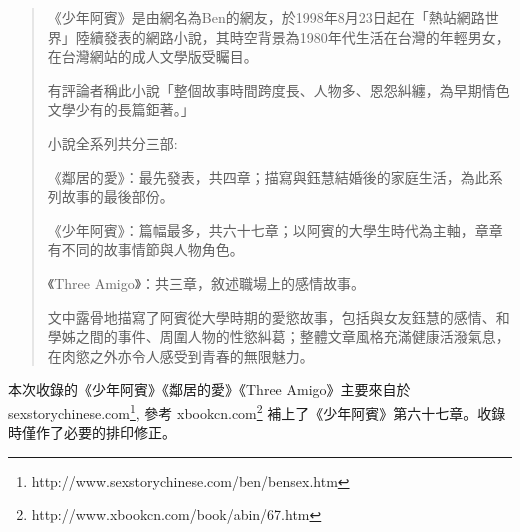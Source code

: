 
\begin{quotation}
《少年阿賓》是由網名為Ben的網友，於1998年8月23日起在「熱站網路世界」陸續發表的網路小說，其時空背景為1980年代生活在台灣的年輕男女，在台灣網站的成人文學版受矚目。

有評論者稱此小說「整個故事時間跨度長、人物多、恩怨糾纏，為早期情色文學少有的長篇鉅著。」

小說全系列共分三部:

《鄰居的愛》：最先發表，共四章；描寫與鈺慧結婚後的家庭生活，為此系列故事的最後部份。

《少年阿賓》：篇幅最多，共六十七章；以阿賓的大學生時代為主軸，章章有不同的故事情節與人物角色。

《Three Amigo》：共三章，敘述職場上的感情故事。

文中露骨地描寫了阿賓從大學時期的愛慾故事，包括與女友鈺慧的感情、和學姊之間的事件、周圍人物的性慾糾葛；整體文章風格充滿健康活潑氣息，在肉慾之外亦令人感受到青春的無限魅力。

\end{quotation}

本次收錄的《少年阿賓》《鄰居的愛》《Three Amigo》主要來自於sexstorychinese.com\footnote{http://www.sexstorychinese.com/ben/bensex.htm}, 參考 xbookcn.com\footnote{http://www.xbookcn.com/book/abin/67.htm} 補上了《少年阿賓》第六十七章。收錄時僅作了必要的排印修正。

